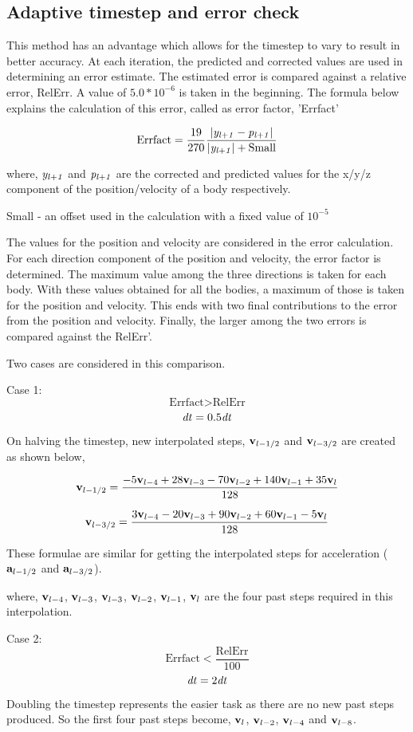 \documentclass[11pt]{article}
\begin{document}
\subsection{Adaptive timestep and error check}
\medskip

{\normalsize{

This method has an advantage which allows for the timestep to vary to result in better accuracy. At each iteration, the predicted and corrected values are used in determining an error estimate. The estimated error is compared against a relative error, RelErr. A value of $5.0 * 10^{-6}$ is taken in the beginning. The formula below explains the calculation of this error, called as error factor, 'Errfact'

\[ \textrm{Errfact} = \frac{19}{270} \frac{\left| {\it y_{l+1}} - {\it p_{l+1}} \right|} {{\left| {\it y_{l+1}} \right|} + \textrm{Small}} \]
\smallskip

where,
${\it y_{l+1}}$ and ${\it p_{l+1}}$ are the corrected and predicted values for the x/y/z component of the position/velocity of a body respectively. 
\smallskip

Small - an offset used in the calculation with a fixed value of $10^{-5}$ 
\medskip

The values for the position and velocity are considered in the error calculation. For each direction component of the position and velocity, the error factor is determined. The maximum value among the three directions is taken for each body. With these values obtained for all the bodies, a maximum of those is taken for the position and velocity. This ends with two final contributions to the error from the position and velocity.  Finally, the larger among the two errors is compared against the RelErr'. 
\medskip

Two cases are considered in this comparison.
\smallskip

Case 1:  \[\textrm{Errfact} > \textrm{RelErr} \]   \[{\it dt} = 0.5{\it dt} \]

On halving the timestep, new interpolated steps, ${\bf v}_{l-{1/2}}$ and ${\bf v}_{l-{3/2}}$ are created as shown below,

\[ {\bf v}_{l-{1/2}} = \frac{-5{\bf v}_{l-4} + 28{\bf v}_{l-3} - 70{\bf v}_{l-2} + 140{\bf v}_{l-1} + 35{\bf v}_l} {128} \]

\[ {\bf v}_{l-{3/2}} = \frac{3{\bf v}_{l-4} - 20{\bf v}_{l-3} + 90{\bf v}_{l-2} + 60{\bf v}_{l-1} - 5{\bf v}_l} {128} \]

These formulae are similar for getting the interpolated steps for acceleration (${\bf a}_{l-{1/2}}$ and ${\bf a}_{l-{3/2}}$). 

where,
${\bf v}_{l-4}$, ${\bf v}_{l-3}$, ${\bf v}_{l-3}$, ${\bf v}_{l-2}$, ${\bf v}_{l-1}$, ${\bf v}_l$ are the four past steps required in this interpolation.

\bigskip

Case 2: \[\textrm{Errfact} < \frac{\textrm{RelErr}} {100} \]    \[{\it dt} = 2{\it dt} \]

Doubling the timestep represents the easier task as there are no new past steps produced. So the first four past steps become, ${\bf v}_l$, ${\bf v}_{l-2}$, ${\bf v}_{l-4}$ and ${\bf v}_{l-8}$. }}
\end{document}

